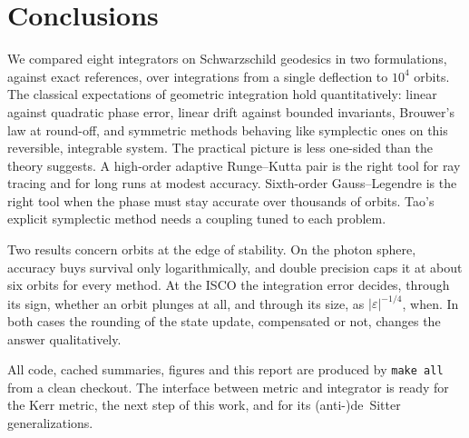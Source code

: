 \section{Conclusions}
\label{sec:conclusions}

We compared eight integrators on Schwarzschild geodesics in two formulations, against exact
references, over integrations from a single deflection to $10^4$ orbits. The classical
expectations of geometric integration hold quantitatively: linear against quadratic phase
error, linear drift against bounded invariants, Brouwer's law at round-off, and symmetric
methods behaving like symplectic ones on this reversible, integrable system. The practical
picture is less one-sided than the theory suggests. A high-order adaptive Runge--Kutta pair is
the right tool for ray tracing and for long runs at modest accuracy. Sixth-order
Gauss--Legendre is the right tool when the phase must stay accurate over thousands of orbits.
Tao's explicit symplectic method needs a coupling tuned to each problem.

Two results concern orbits at the edge of stability. On the photon sphere, accuracy buys
survival only logarithmically, and double precision caps it at about six orbits for every
method. At the ISCO the integration error decides, through its sign, whether an orbit plunges
at all, and through its size, as $|\varepsilon|^{-1/4}$, when. In both cases the rounding of
the state update, compensated or not, changes the answer qualitatively.

All code, cached summaries, figures and this report are produced by \texttt{make all} from a
clean checkout. The interface between metric and integrator is ready for the Kerr metric, the
next step of this work, and for its (anti-)de~Sitter generalizations.
